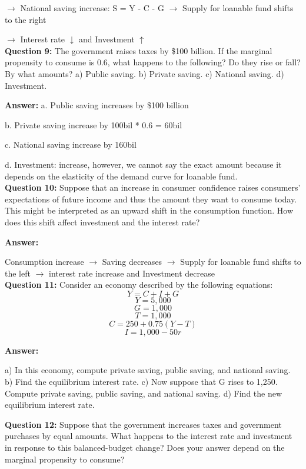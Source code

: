 \documentclass[a4paper, 11pt]{article}
\begin{document}
$\rightarrow$ National saving increase: S = Y - C - G $\rightarrow$ Supply for loanable fund shifts to the right

$\rightarrow$ Interest rate $\downarrow$ and Investment $\uparrow$
\\

\textbf{Question 9:} The government raises taxes by \$100 billion. If the marginal propensity to consume is 0.6, what happens to the following? Do they rise or fall? By what amounts?
a) Public saving.
b) Private saving.
c) National saving.
d) Investment.

\textbf{Answer:} 
a. Public saving increases by \$100 billion

b. Private saving increase by 100bil * 0.6 = 60bil

c. National saving increase by 160bil

d. Investment: increase, however, we cannot say the exact amount because it depends on the elasticity of the demand curve for loanable fund. \\


\textbf{Question 10:} Suppose that an increase in consumer confidence raises consumers’ expectations of future income and thus the amount they want to consume today. This might be interpreted as an upward shift in the consumption function. How does this shift affect investment and the interest rate?

\textbf{Answer:} 

Consumption increase $\rightarrow$ Saving decreases $\rightarrow$ Supply for loanable fund shifts to the left $\rightarrow$ interest rate increase and Investment decrease
 \\

\textbf{Question 11:} Consider an economy described by the following equations:
$$Y=C+I+G$$
$$Y=5,000$$
$$G=1,000$$
$$T=1,000$$
$$C=250 +0.75(Y −T)$$
$$I=1,000 −50r$$

\textbf{Answer:} 

a) In this economy, compute private saving, public saving, and national saving. \\
b) Find the equilibrium interest rate.
c) Now suppose that G rises to 1,250. Compute private saving, public saving, and national saving.
d) Find the new equilibrium interest rate.

\textbf{Question 12:} Suppose that the government increases taxes and government purchases by equal amounts. What happens to the interest rate and investment in response to this balanced-budget change? Does your answer depend on the marginal propensity to consume?
\end{document}
